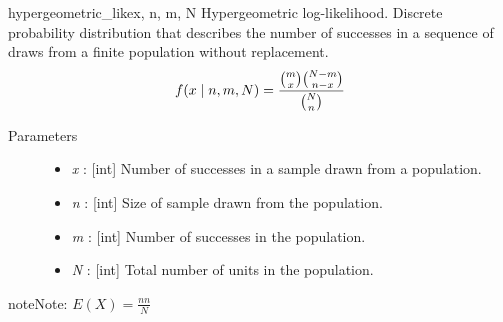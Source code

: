 \hypertarget{pymc.distributions.hypergeometric_like}{}\begin{funcdesc}{hypergeometric\_like}{x, n, m, N}
Hypergeometric log-likelihood. Discrete probability distribution that
describes the number of successes in a sequence of draws from a finite
population without replacement.
\begin{gather}
\begin{split}f(x \mid n, m, N) = \frac{\binom{m}{x}\binom{N-m}{n-x}}{\binom{N}{n}}\end{split}\notag
\end{gather}\begin{description}
\item[Parameters] \leavevmode\begin{itemize}
\item {}
\emph{x} : {[}int{]} Number of successes in a sample drawn from a population.

\item {}
\emph{n} : {[}int{]} Size of sample drawn from the population.

\item {}
\emph{m} : {[}int{]} Number of successes in the population.

\item {}
\emph{N} : {[}int{]} Total number of units in the population.

\end{itemize}

\end{description}

\begin{notice}{note}{Note:}
$E(X) = \frac{n n}{N}$
\end{notice}
\end{funcdesc}


